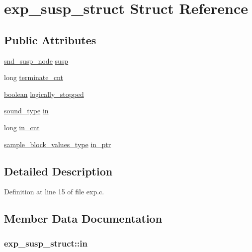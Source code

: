 \hypertarget{structexp__susp__struct}{}\section{exp\+\_\+susp\+\_\+struct Struct Reference}
\label{structexp__susp__struct}
\subsection*{Public Attributes}
\begin{DoxyCompactItemize}
\item 
\hyperlink{sound_8h_a6b268203688a934bd798ceb55f85d4c0}{snd\+\_\+susp\+\_\+node} \hyperlink{structexp__susp__struct_a4ce803d6d2d7fd7e3b09c7b219affcdd}{susp}
\item 
long \hyperlink{structexp__susp__struct_a4b90b8b57e4d6f068b3003fd99fefc51}{terminate\+\_\+cnt}
\item 
\hyperlink{cext_8h_a7670a4e8a07d9ebb00411948b0bbf86d}{boolean} \hyperlink{structexp__susp__struct_a29f5377a6e3ee4ba727313ab87bf021a}{logically\+\_\+stopped}
\item 
\hyperlink{sound_8h_a792cec4ed9d6d636d342d9365ba265ea}{sound\+\_\+type} \hyperlink{structexp__susp__struct_a4efd5c2d82afe1ec79a6ce4734cc1c78}{in}
\item 
long \hyperlink{structexp__susp__struct_ad99b87b846d82342e680005923bca849}{in\+\_\+cnt}
\item 
\hyperlink{sound_8h_a83d17f7b465d1591f27cd28fc5eb8a03}{sample\+\_\+block\+\_\+values\+\_\+type} \hyperlink{structexp__susp__struct_a8a4fd3d5c63a1d9bfc29eb1462041609}{in\+\_\+ptr}
\end{DoxyCompactItemize}


\subsection{Detailed Description}


Definition at line 15 of file exp.\+c.



\subsection{Member Data Documentation}
\subsubsection[{\texorpdfstring{in}{in}}]{ exp\+\_\+susp\+\_\+struct\+::in}\hypertarget{structexp__susp__struct_a4efd5c2d82afe1ec79a6ce4734cc1c78}{}\label{structexp__susp__struct_a4efd5c2d82afe1ec79a6ce4734cc1c78}


